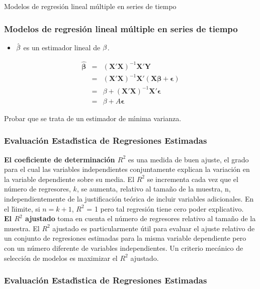 \documentclass[xcolor=(list of options)]{beamer}
\begin{document}
\begin{section}{Modelos de regresi\'on lineal m\'ultiple en series de tiempo}
\begin{frame}
\end{frame}
\begin{frame}
\frametitle{Modelos de regresi\'on lineal m\'ultiple en series de tiempo}
\begin{itemize}
\item $\hat{\text{\ensuremath{\beta}}}$ es un estimador lineal de $\text{\ensuremath{\beta}}$. 
\end{itemize}
\begin{eqnarray*}
\hat{\mathbf{\beta}} & = & (\mathbf{X'X})^{-1}\mathbf{X'Y}\\
 & = & (\mathbf{X'X})^{-1}\mathbf{X'}\left(\mathbf{X\beta}+\mathbf{\mathbf{\epsilon}}\right)\\
 & = & \beta+(\mathbf{X'X})^{-1}\mathbf{X'}\mathbf{\mathbf{\epsilon}}\\
 & = & \beta+A\mathbf{\mathbf{\epsilon}}
\end{eqnarray*}

Probar que se trata de un estimador de m\'\i{}nima varianza.
\end{frame}
\begin{frame}
\frametitle{Evaluaci\'on Estad\'\i{}stica de Regresiones Estimadas}

\textbf{El coeficiente de determinaci\'on $R^2$} es una medida de buen ajuste, el grado para el cual las variables independientes conjuntamente explican la variaci\'on en la variable dependiente sobre su media. El $R^2$ se incrementa cada vez que el n\'umero de regresores, $k$, se aumenta, relativo al tama\~no de la muestra, n, independientemente de la justificaci\'on te\'orica de incluir variables adicionales. En el l\'\i{}imite, si $n=k+1$, $R^2$ = 1 pero tal regresi\'on tiene cero poder explicativo. \\
\vspace{5mm}
\textbf{El $R^2$ ajustado} toma en cuenta el n\'umero de regresores relativo al tama\~no de la muestra. El $R^2$ ajustado es particularmente \'util para evaluar el ajuste relativo de un conjunto de regresiones estimadas para la misma variable dependiente pero con un n\'umero diferente de variables independientes.  Un criterio mec\'anico de selecci\'on de modelos es maximizar el $R^2$ ajustado.

\end{frame}
\begin{frame}
\frametitle{Evaluaci\'on Estad\'\i{}stica de Regresiones Estimadas}


\end{frame}
\end{section}
\end{document}
